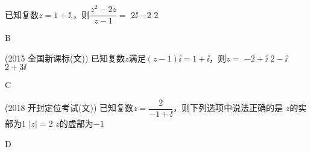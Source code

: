 \begin{exercise}
      已知复数$z=1+\ii$,，则$\dfrac{z^2-2z}{z-1}=$\xz
      \xx{$-2\ii$}
       {$2\ii$}
       {$-2$}
       {$2$}
      \begin{answer}
        B
      \end{answer}
    \item %
        {\kaishu (2015 \textbullet 全国新课标(文))}
        已知复数$z$满足$(z-1)\ii=1+\ii$，则$z=$\xz
         {$-2+\ii$}
         {$2-\ii$}
         {$2+3\ii$}
        \begin{answer}
          C
        \end{answer}
    \item %
        {\kaishu (2018 \textbullet 开封定位考试(文))}
        已知复数$z=\dfrac{2}{-1+\ii}$，则下列选项中说法正确的是\xz
         {$z$的实部为$1$}
         {$|z|=2$}
         {$z$的虚部为$-1$}
        \begin{answer}
          D
        \end{answer}
  \end{exercise}
\newpage
